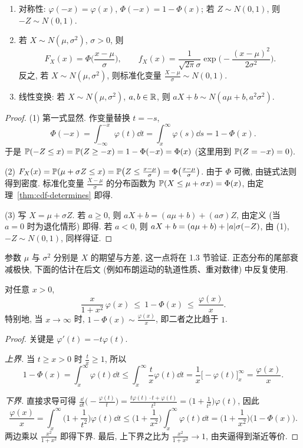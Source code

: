 \begin{proposition}[正态分布的基本性质]\label{prop:normal-basic}
\begin{enumerate}
\item 对称性: $\varphi(-x)=\varphi(x)$, $\Phi(-x)=1-\Phi(x)$; 若 $Z\sim N(0,1)$, 则 $-Z\sim N(0,1)$.
\item 若 $X\sim N(\mu,\sigma^2)$, $\sigma>0$, 则
\[
F_X(x)=\Phi\Big(\frac{x-\mu}{\sigma}\Big),\qquad f_X(x)=\frac{1}{\sqrt{2\pi}\sigma}\exp\Big(-\frac{(x-\mu)^2}{2\sigma^2}\Big).
\]
反之, 若 $X\sim N(\mu,\sigma^2)$, 则标准化变量 $\frac{X-\mu}{\sigma}\sim N(0,1)$.
\item 线性变换: 若 $X\sim N(\mu,\sigma^2)$, $a,b\in\R$, 则 $aX+b\sim N(a\mu+b,a^2\sigma^2)$.
\end{enumerate}
\end{proposition}

\begin{proof}
(1) 第一式显然. 作变量替换 $t=-s$,
\[
\Phi(-x)=\int_{-\infty}^{-x}\varphi(t)\dd t=\int_x^{\infty}\varphi(s)\dd s=1-\Phi(x).
\]
于是 $\P(-Z\le x)=\P(Z\ge-x)=1-\Phi(-x)=\Phi(x)$ (这里用到 $\P(Z=-x)=0$).

(2) $F_X(x)=\P(\mu+\sigma Z\le x)=\P\big(Z\le\frac{x-\mu}{\sigma}\big)=\Phi\big(\frac{x-\mu}{\sigma}\big)$. 由于 $\Phi$ 可微, 由链式法则得到密度. 标准化变量 $\frac{X-\mu}{\sigma}$ 的分布函数为 $\P(X\le\mu+\sigma x)=\Phi(x)$, 由定理~\ref{thm:cdf-determines} 即得.

(3) 写 $X=\mu+\sigma Z$. 若 $a\ge0$, 则 $aX+b=(a\mu+b)+(a\sigma)Z$, 由定义 (当 $a=0$ 时为退化情形) 即得. 若 $a<0$, 则 $aX+b=(a\mu+b)+\abs{a}\sigma(-Z)$, 由 (1), $-Z\sim N(0,1)$, 同样得证.
\end{proof}

参数 $\mu$ 与 $\sigma^2$ 分别是 $X$ 的期望与方差, 这一点将在 1.3 节验证. 正态分布的尾部衰减极快, 下面的估计在后文 (例如布朗运动的轨道性质、重对数律) 中反复使用.

\begin{theorem}[正态尾概率估计]\label{thm:mills}
对任意 $x>0$,
\[
\frac{x}{1+x^2}\,\varphi(x)\ \le\ 1-\Phi(x)\ \le\ \frac{\varphi(x)}{x}.
\]
特别地, 当 $x\to\infty$ 时, $1-\Phi(x)\sim\frac{\varphi(x)}{x}$, 即二者之比趋于 $1$.
\end{theorem}

\begin{proof}
关键是 $\varphi'(t)=-t\varphi(t)$.

\emph{上界.} 当 $t\ge x>0$ 时 $\frac{t}{x}\ge1$, 所以
\[
1-\Phi(x)=\int_x^\infty\varphi(t)\dd t\le\int_x^\infty\frac{t}{x}\varphi(t)\dd t=\frac{1}{x}\Big[-\varphi(t)\Big]_x^\infty=\frac{\varphi(x)}{x}.
\]

\emph{下界.} 直接求导可得
$\frac{\dd}{\dd t}\Big(-\frac{\varphi(t)}{t}\Big)=\frac{t\varphi(t)\cdot t+\varphi(t)}{t^2}=\Big(1+\frac{1}{t^2}\Big)\varphi(t)$, 因此
\[
\frac{\varphi(x)}{x}=\int_x^\infty\Big(1+\frac{1}{t^2}\Big)\varphi(t)\dd t\le\Big(1+\frac{1}{x^2}\Big)\int_x^\infty\varphi(t)\dd t=\Big(1+\frac{1}{x^2}\Big)\big(1-\Phi(x)\big).
\]
两边乘以 $\frac{x^2}{1+x^2}$ 即得下界. 最后, 上下界之比为 $\frac{x^2}{1+x^2}\to1$, 由夹逼得到渐近等价.
\end{proof}

